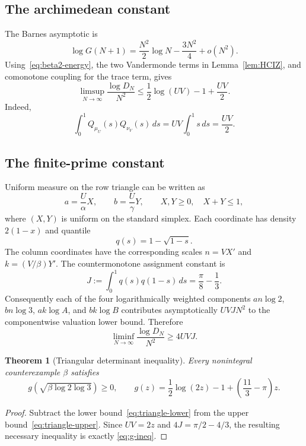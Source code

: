 \documentclass[11pt]{article}
\newtheorem{theorem}{Theorem}[section]
\theoremstyle{definition}
\begin{document}
\subsection{The archimedean constant}

The Barnes asymptotic is
\[
 \log G(N+1)=\frac{N^2}{2}\log N-\frac{3N^2}{4}+o(N^2).
\]
Using~\eqref{eq:beta2-energy}, the two Vandermonde terms in
Lemma~\ref{lem:HCIZ}, and comonotone coupling for the trace term, gives
\begin{equation}\label{eq:triangle-upper}
 \limsup_{N\to\infty}\frac{\log D_N}{N^2}
 \le \frac12\log(UV)-1+\frac{UV}{2}.
\end{equation}
Indeed,
\[
 \int_0^1Q_{\mu_U}(s)Q_{\nu_V}(s)\,ds
 =UV\int_0^1s\,ds=\frac{UV}{2}.
\]

\subsection{The finite-prime constant}

Uniform measure on the row triangle can be written as
\[
 a=\frac U\alpha X,\qquad b=\frac U\gamma Y,
 \qquad X,Y\ge0,\quad X+Y\le1,
\]
where $(X,Y)$ is uniform on the standard simplex.  Each coordinate has density
$2(1-x)$ and quantile
\[
 q(s)=1-\sqrt{1-s}.
\]
The column coordinates have the corresponding scales
$n=V X'$ and $k=(V/\beta)Y'$.
The countermonotone assignment constant is
\begin{equation}\label{eq:J}
 J:=\int_0^1q(s)q(1-s)\,ds
 =\frac\pi8-\frac13.
\end{equation}
Consequently each of the four logarithmically weighted components
$an\log2$, $bn\log3$, $ak\log A$, and $bk\log B$ contributes asymptotically
$UVJ N^2$ to the componentwise valuation lower bound.  Therefore
\begin{equation}\label{eq:triangle-lower}
 \liminf_{N\to\infty}\frac{\log D_N}{N^2}\ge4UVJ.
\end{equation}

\begin{theorem}[Triangular determinant inequality]\label{thm:triangle-inequality}
Every nonintegral counterexample $\beta$ satisfies
\begin{equation}\label{eq:g-ineq}
 \boxed{
 g\!\left(\sqrt{\beta\log2\log3}\right)\ge0,
 \qquad
 g(z)=\frac12\log(2z)-1+\left(\frac{11}{3}-\pi\right)z.}
\end{equation}
\end{theorem}
\begin{proof}
Subtract the lower bound~\eqref{eq:triangle-lower} from the upper
bound~\eqref{eq:triangle-upper}.  Since $UV=2z$ and
$4J=\pi/2-4/3$, the resulting necessary inequality is exactly
\eqref{eq:g-ineq}.
\end{proof}
\end{document}
